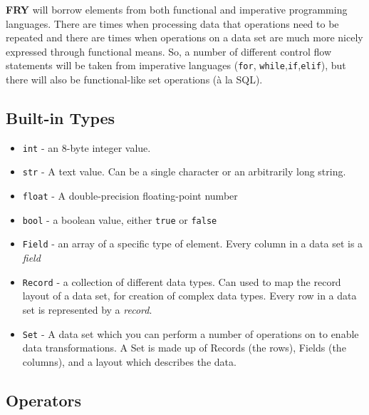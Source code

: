 \documentclass{article}
\begin{document}
\textbf{FRY} will borrow elements from both functional and imperative programming languages. There are times when processing data that operations need to be repeated and there are times when operations on a data set are much more nicely expressed through functional means. So, a number of different control flow statements will be taken from imperative languages (\texttt{for}, \texttt{while},\texttt{if},\texttt{elif}), but there will also be functional-like set operations (\`a la SQL).



\subsection{Built-in Types}

\begin{itemize}
	
\item \texttt{int} - an 8-byte integer value.

\item \texttt{str} - A text value. Can be a single character or an arbitrarily long string.

\item \texttt{float} - A double-precision floating-point number

\item \texttt{bool} - a boolean value, either \texttt{true} or \texttt{false}

\item \texttt{Field} - an array of a specific type of element. Every column in a data set is a \emph{field}

\item \texttt{Record} - a collection of different data types. Can used to map the record layout of a data set, for creation of complex data types. Every row in a data set is represented by a \emph{record}.

\item \texttt{Set} - A data set which you can perform a number of operations on to enable data transformations. A Set is made up of Records (the rows), Fields (the columns), and a layout which describes the data. 

\end{itemize}

\subsection{Operators}
\end{document}
